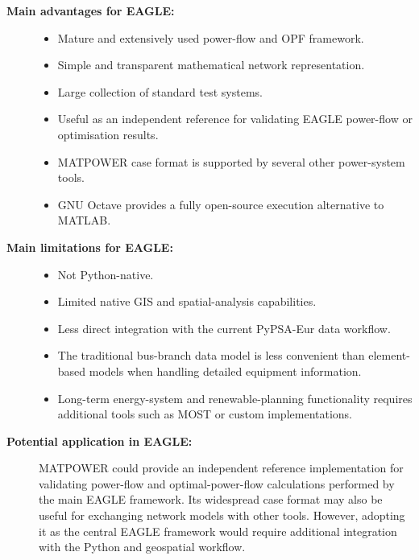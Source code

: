 \begin{description}
    \item[\textbf{Main advantages for EAGLE:}] \hfill
    \begin{itemize}
        \item Mature and extensively used power-flow and OPF framework.
        \item Simple and transparent mathematical network representation.
        \item Large collection of standard test systems.
        \item Useful as an independent reference for validating EAGLE
        power-flow or optimisation results.
        \item MATPOWER case format is supported by several other
        power-system tools.
        \item GNU Octave provides a fully open-source execution alternative
        to MATLAB.
    \end{itemize}

    \item[\textbf{Main limitations for EAGLE:}] \hfill
    \begin{itemize}
        \item Not Python-native.
        \item Limited native GIS and spatial-analysis capabilities.
        \item Less direct integration with the current PyPSA-Eur data
        workflow.
        \item The traditional bus-branch data model is less convenient than
        element-based models when handling detailed equipment information.
        \item Long-term energy-system and renewable-planning functionality
        requires additional tools such as MOST or custom implementations.
    \end{itemize}

    \item[\textbf{Potential application in EAGLE:}]
    MATPOWER could provide an independent reference implementation for
    validating power-flow and optimal-power-flow calculations performed by
    the main EAGLE framework. Its widespread case format may also be useful
    for exchanging network models with other tools. However, adopting it as
    the central EAGLE framework would require additional integration with
    the Python and geospatial workflow.

\end{description}



